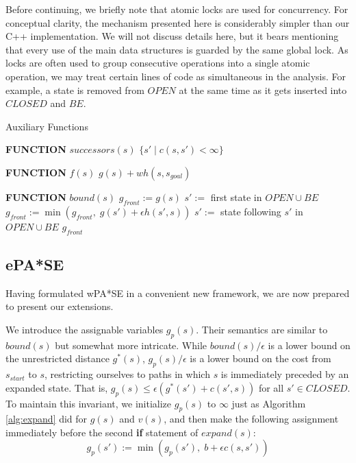 \documentclass[letterpaper]{article}
\begin{document}
Before continuing, we briefly note that atomic locks are used for concurrency. For conceptual clarity, the mechanism presented here is considerably simpler than our C++ implementation. We will not discuss details here, but it bears mentioning that every use of the main data structures is guarded by the same global lock. As locks are often used to group consecutive operations into a single atomic operation, we may treat certain lines of code as simultaneous in the analysis. For example, a state is removed from $OPEN$ at the same time as it gets inserted into $CLOSED$ and $BE$.

\begin{algorithm}
\caption{Auxiliary Functions}
\label{alg:aux}
\begin{algorithmic}
\STATE \textbf{FUNCTION} $successors(s)$
\RETURN $\{s' \mid c(s,s')<\infty\}$

\STATE \textbf{FUNCTION} $f(s)$
\RETURN $g(s) + wh(s,s_{goal})$

\STATE \textbf{FUNCTION} $bound(s)$
\STATE $g_{front} := g(s)$
\STATE $s' :=$ first state in $OPEN \cup BE$
\STATE $g_{front} := \min(g_{front},\;g(s') + \epsilon h(s',s))$
\STATE $s' :=$ state following $s'$ in $OPEN \cup BE$
\ENDWHILE
\RETURN $g_{front}$
\end{algorithmic}
\end{algorithm}

\subsection{ePA*SE}

Having formulated wPA*SE in a convenient new framework, we are now prepared to present our extensions.

We introduce the assignable variables $g_p(s)$. Their semantics are similar to $bound(s)$ but somewhat more intricate. While $bound(s)/\epsilon$ is a lower bound on the unrestricted distance $g^*(s)$, $g_p(s)/\epsilon$ is a lower bound on the cost from $s_{start}$ to $s$, restricting ourselves to paths in which $s$ is immediately preceded by an expanded state. That is, $g_p(s) \le \epsilon (g^*(s') + c(s',s))$ for all $s'\in CLOSED$. To maintain this invariant, we initialize $g_p(s)$ to $\infty$ just as Algorithm \ref{alg:expand} did for $g(s)$ and $v(s)$, and then make the following assignment immediately before the second \textbf{if} statement of $expand(s)$:
\[g_p(s') := \min(g_p(s'),\; b + \epsilon c(s,s'))\]
\end{document}

